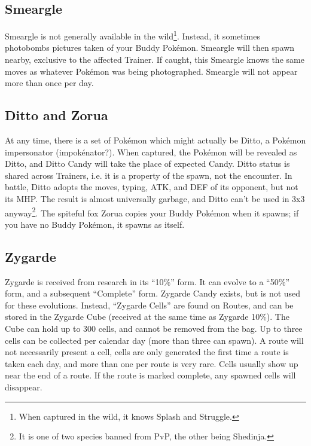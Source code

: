 \subsection{Smeargle}
\label{subsec:smeargle}
Smeargle is not generally available in the wild\footnote{When captured in the wild, it knows Splash and Struggle.}.
Instead, it sometimes photobombs pictures taken of your Buddy Pokémon.
Smeargle will then spawn nearby, exclusive to the affected Trainer.
If caught, this Smeargle knows the same moves as whatever Pokémon was being photographed.
Smeargle will not appear more than once per day.

\subsection{Ditto and Zorua}
\label{subsec:ditto}
At any time, there is a set of Pokémon which might actually be Ditto,
  a Pokémon impersonator (impokénator?).
When captured, the Pokémon will be revealed as Ditto, and Ditto Candy will take
  the place of expected Candy.
Ditto status is shared across Trainers, i.e. it is a property of the spawn, not the encounter.
In battle, Ditto adopts the moves, typing, ATK, and DEF of its opponent, but not its MHP\@.
The result is almost universally garbage, and Ditto can't be used in 3x3 anyway\footnote{It is one of two species banned from PvP, the other being Shedinja.}.
The spiteful fox Zorua copies your Buddy Pokémon when it spawns; if you have no Buddy
  Pokémon, it spawns as itself.

\subsection{Zygarde}
\label{subsec:zygarde}
Zygarde is received from research in its ``10\%'' form.
It can evolve to a ``50\%'' form, and a subsequent ``Complete'' form.
Zygarde Candy exists, but is not used for these evolutions.
Instead, ``Zygarde Cells'' are found on Routes, and can be stored in the Zygarde Cube
 (received at the same time as Zygarde 10\%).
The Cube can hold up to 300 cells, and cannot be removed from the bag.
Up to three cells can be collected per calendar day (more than three can spawn).
A route will not necessarily present a cell, cells are only generated the first
  time a route is taken each day, and more than one per route is very rare.
Cells usually show up near the end of a route.
If the route is marked complete, any spawned cells will disappear.

